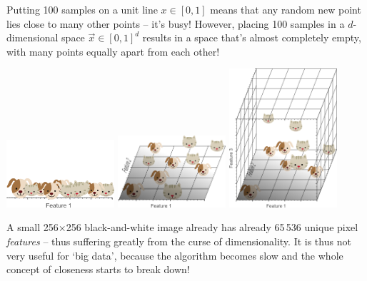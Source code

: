 \documentclass{article}
\begin{document}
\begin{spexample}
    Putting 100 samples on a unit line $x\in[0,1]$ means that any random new point lies close to many other points -- it's busy! However, placing 100 samples in a $d$-dimensional space $\vec{x}\in[0,1]^d$ results in a space that's almost completely empty, with many points equally apart from each other!
    \begin{center}
    \includegraphics[width=0.3\textwidth]{1Dproblem.png}    \includegraphics[width=0.3\textwidth]{2Dproblem.png}    \includegraphics[width=0.3\textwidth]{3Dproblem.png}
\end{center}
\end{spexample}\vspace{-0.3cm}
{\flushleft A} small 256$\times$256 black-and-white image already has already 65\,536 unique pixel \textit{features} -- thus suffering greatly from the curse of dimensionality. It is thus not very useful for `big data', because the algorithm becomes slow and the whole concept of closeness starts to break down!
\end{document}
